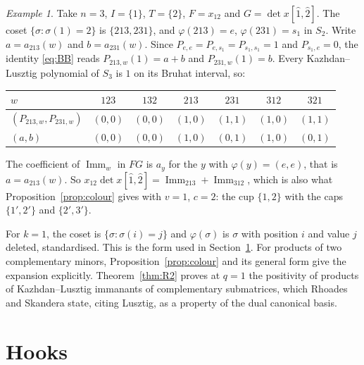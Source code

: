 \documentclass[11pt]{amsart}
\theoremstyle{definition}
\theoremstyle{remark}
\newtheorem{exa}{Example}[section]
\newcommand{\Imm}{\operatorname{Imm}}
\begin{document}
\begin{exa}\label{exa:R2}
Take $n=3$, $I=\{1\}$, $T=\{2\}$, $F=x_{12}$ and $G=\det x[\hat1,\hat2]$. The coset $\{\sigma:\sigma(1)=2\}$ is $\{213,231\}$, and $\varphi(213)=e$, $\varphi(231)=s_1$ in $S_2$. Write $a=a_{213}(w)$ and $b=a_{231}(w)$. Since $P_{e,e}=P_{e,s_1}=P_{s_1,s_1}=1$ and $P_{s_1,e}=0$, the identity \eqref{eq:BB} reads $P_{213,w}(1)=a+b$ and $P_{231,w}(1)=b$. Every Kazhdan--Lusztig polynomial of $S_3$ is $1$ on its Bruhat interval, so:
\begin{center}
\begin{tabular}{lcccccc}
\toprule
$w$ & $123$ & $132$ & $213$ & $231$ & $312$ & $321$\\
\midrule
$(P_{213,w},P_{231,w})$ & $(0,0)$ & $(0,0)$ & $(1,0)$ & $(1,1)$ & $(1,0)$ & $(1,1)$\\
$(a,b)$ & $(0,0)$ & $(0,0)$ & $(1,0)$ & $(0,1)$ & $(1,0)$ & $(0,1)$\\
\bottomrule
\end{tabular}
\end{center}
The coefficient of $\Imm_w$ in $FG$ is $a_y$ for the $y$ with $\varphi(y)=(e,e)$, that is $a=a_{213}(w)$. So $x_{12}\det x[\hat1,\hat2]=\Imm_{213}+\Imm_{312}$, which is also what Proposition~\ref{prop:colour} gives with $v=1$, $c=2$: the cup $\{1,2\}$ with the caps $\{1',2'\}$ and $\{2',3'\}$.
\end{exa}

For $k=1$, the coset is $\{\sigma:\sigma(i)=j\}$ and $\varphi(\sigma)$ is $\sigma$ with position $i$ and value $j$ deleted, standardised. This is the form used in Section~\ref{sec:hooks}. For products of two complementary minors, Proposition~\ref{prop:colour} and its general form \cite[Prop.~4.3]{RS05} give the expansion explicitly. Theorem~\ref{thm:R2} proves at $q=1$ the positivity of products of Kazhdan--Lusztig immanants of complementary submatrices, which Rhoades and Skandera \cite[(3.4)]{RSbit} state, citing Lusztig, as a property of the dual canonical basis.

\section{Hooks}\label{sec:hooks}
\end{document}

